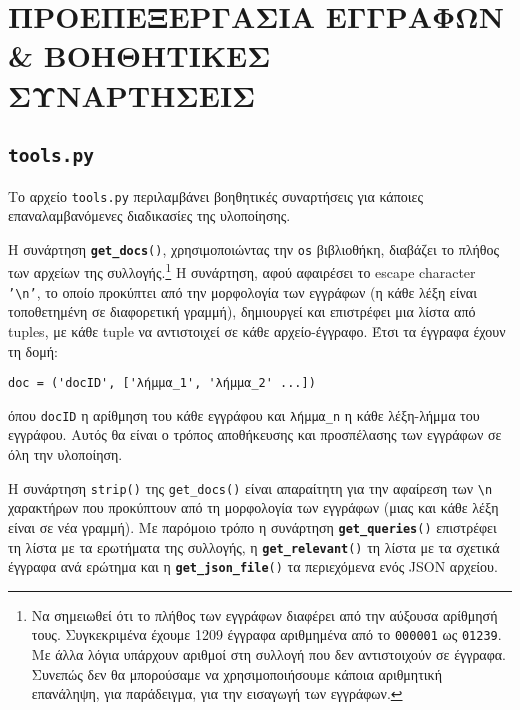 ﻿\documentclass[12pt]{report}
\begin{document}
        \section{ΠΡΟΕΠΕΞΕΡΓΑΣΙΑ ΕΓΓΡΑΦΩΝ \& ΒΟΗΘΗΤΙΚΕΣ ΣΥΝΑΡΤΗΣΕΙΣ}
            
            \subsection{\tt tools.py}

                Το αρχείο \texttt{tools.py} περιλαμβάνει βοηθητικές συναρτήσεις για κάποιες επαναλαμβανόμενες διαδικασίες της υλοποίησης.

                Η συνάρτηση \texttt{\textbf{get\_docs}()}, χρησιμοποιώντας την \texttt{os} βιβλιοθήκη, διαβάζει το πλήθος των αρχείων της συλλογής.\footnote{Να σημειωθεί ότι το πλήθος των εγγράφων διαφέρει από την αύξουσα αρίθμησή τους. Συγκεκριμένα έχουμε 1209 έγγραφα αριθμημένα από το \texttt{000001} ως \texttt{01239}. Με άλλα λόγια υπάρχουν αριθμοί στη συλλογή που δεν αντιστοιχούν σε έγγραφα. Συνεπώς δεν θα μπορούσαμε να χρησιμοποιήσουμε κάποια αριθμητική επανάληψη, για παράδειγμα, για την εισαγωγή των εγγράφων.}
                Η συνάρτηση, αφού αφαιρέσει το escape character \texttt{'\textbackslash n'}, το οποίο προκύπτει από την μορφολογία των εγγράφων (η κάθε λέξη είναι τοποθετημένη σε διαφορετική γραμμή),
                δημιουργεί \linebreak και επιστρέφει μια λίστα από tuples, με κάθε tuple να αντιστοιχεί σε κάθε αρχείο-έγγραφο. \linebreak
                Έτσι τα έγγραφα έχουν τη δομή:
                    \begin{graycomment} \centering
                    \verb|doc = ('docID', ['λήμμα_1', 'λήμμα_2' ...])|
                    \end{graycomment}

                \noindent όπου \texttt{docID} η αρίθμηση του κάθε εγγράφου και \verb|λήμμα_n| η κάθε λέξη-λήμμα του εγγράφου.
                Αυτός θα είναι ο τρόπος αποθήκευσης και προσπέλασης των εγγράφων σε όλη την υλοποίηση.

                Η συνάρτηση \texttt{strip()} της \verb|get_docs()| είναι απαραίτητη για την αφαίρεση των \texttt{\textbackslash n} χαρακτήρων
                που προκύπτουν από τη μορφολογία των εγγράφων (μιας και κάθε λέξη είναι σε νέα γραμμή).
                Με παρόμοιο τρόπο η συνάρτηση \texttt{\textbf{get\_queries}()} επιστρέφει τη λίστα με τα ερωτήματα της συλλογής,
                η \texttt{\textbf{get\_relevant}()} τη λίστα με τα σχετικά έγγραφα ανά ερώτημα και η \texttt{\textbf{get\_json\_file}()} τα περιεχόμενα ενός JSON αρχείου.
\end{document}
